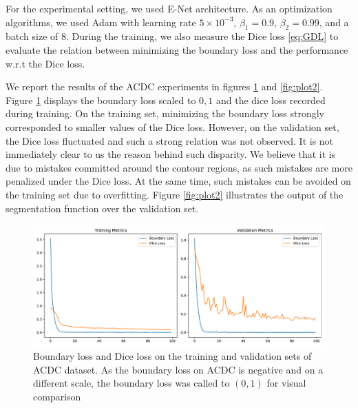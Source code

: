 \documentclass[onecolumn]{article}
\begin{document}
For the experimental setting, we used E-Net \cite{paszke2016enet} architecture. As an optimization algorithms, we used Adam \cite{kingma2014adam} with learning rate $5\times10^{-3}$, $\beta_1=0.9$, $\beta_2=0.99$, and a batch size of $8$. During the training, we also measure the Dice loss \eqref{eq:GDL} to evaluate the relation between minimizing the boundary loss and the performance w.r.t the Dice loss. 

We report the results of the ACDC experiments in figures \ref{fig:plot1} and \ref{fig:plot2}. Figure \ref{fig:plot1} displays the boundary loss scaled to $0,1$ and the dice loss recorded during training. On the training set, minimizing the boundary loss strongly corresponded to smaller values of the Dice loss. However, on the validation set, the Dice loss fluctuated and such a strong relation was not observed. It is not immediately clear to us the reason behind such disparity. We believe that it is due to mistakes committed around the contour regions, as such mistakes are more penalized under the Dice loss. At the same time, such mistakes can be avoided on the training set due to overfitting. Figure \ref{fig:plot2} illustrates the output of the segmentation function over the validation set.
\begin{figure}[h!]
    \centering
    \includegraphics[width=0.8\linewidth]{figures/plot1.pdf}
    \caption{Boundary loss and Dice loss on the training and validation sets of ACDC dataset. As the boundary loss on ACDC is negative and on a different scale, the boundary loss was called to $(0,1)$ for visual comparison}
    \label{fig:plot1}
\end{figure}
\end{document}
